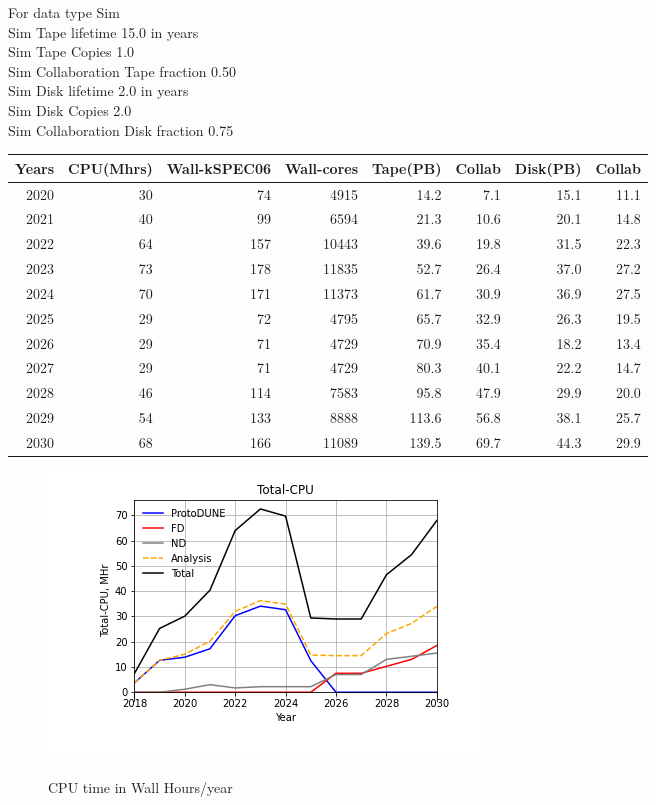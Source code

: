 \documentclass[12pt]{article}
\begin{document}
For data type Sim\\
   Sim Tape lifetime  15.0 in years\\
   Sim Tape Copies   1.0\\
   Sim Collaboration Tape fraction  0.50\\
   Sim Disk lifetime   2.0 in years\\
   Sim Disk Copies   2.0\\
   Sim Collaboration Disk fraction  0.75\\
\begin{tabular}[h]{rrrrrrrr}
Years&CPU(Mhrs)&Wall-kSPEC06&Wall-cores&Tape(PB)&Collab&Disk(PB)&Collab\\
\hline
2020&	       30&	       74&	     4915&	     14.2&	      7.1&	     15.1&	     11.1\\
2021&	       40&	       99&	     6594&	     21.3&	     10.6&	     20.1&	     14.8\\
2022&	       64&	      157&	    10443&	     39.6&	     19.8&	     31.5&	     22.3\\
2023&	       73&	      178&	    11835&	     52.7&	     26.4&	     37.0&	     27.2\\
2024&	       70&	      171&	    11373&	     61.7&	     30.9&	     36.9&	     27.5\\
2025&	       29&	       72&	     4795&	     65.7&	     32.9&	     26.3&	     19.5\\
2026&	       29&	       71&	     4729&	     70.9&	     35.4&	     18.2&	     13.4\\
2027&	       29&	       71&	     4729&	     80.3&	     40.1&	     22.2&	     14.7\\
2028&	       46&	      114&	     7583&	     95.8&	     47.9&	     29.9&	     20.0\\
2029&	       54&	      133&	     8888&	    113.6&	     56.8&	     38.1&	     25.7\\
2030&	       68&	      166&	    11089&	    139.5&	     69.7&	     44.3&	     29.9\\
\end{tabular}
\pagebreak\begin{figure}
\centering\includegraphics[height=0.5\textwidth]{Total-CPU.png}\label{TotalCPU}
\caption{CPU time in Wall Hours/year}
\end{figure}
\end{document}
